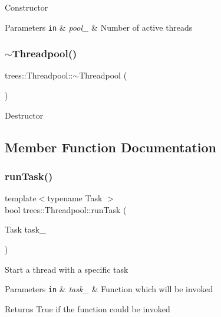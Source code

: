 Constructor


\begin{DoxyParams}[1]{Parameters}
\mbox{\tt in}  & {\em pool\+\_\+} & Number of active threads \\
\hline
\end{DoxyParams}
\mbox{\label{classtrees_1_1_threadpool_afb783a8a8b881f2f0be9cae58550d345}} 
\subsubsection{\texorpdfstring{$\sim$\+Threadpool()}{~Threadpool()}}
{\footnotesize\ttfamily trees\+::\+Threadpool\+::$\sim$\+Threadpool (\begin{DoxyParamCaption}{ }\end{DoxyParamCaption})\hspace{0.3cm}{\ttfamily [inline]}}

Destructor 

\subsection{Member Function Documentation}
\mbox{\label{classtrees_1_1_threadpool_a5aa569f51cc6095e8017500c7e6b074d}} 
\subsubsection{\texorpdfstring{run\+Task()}{runTask()}}
{\footnotesize\ttfamily template$<$typename Task $>$ \\
bool trees\+::\+Threadpool\+::run\+Task (\begin{DoxyParamCaption}\item[{Task}]{task\+\_\+ }\end{DoxyParamCaption})\hspace{0.3cm}{\ttfamily [inline]}}

Start a thread with a specific task


\begin{DoxyParams}[1]{Parameters}
\mbox{\tt in}  & {\em task\+\_\+} & Function which will be invoked \\
\hline
\end{DoxyParams}
\begin{DoxyReturn}{Returns}
True if the function could be invoked 
\end{DoxyReturn}
\mbox{\label{classtrees_1_1_threadpool_a3d6488b730cc53472239f9c74e384d64}} 
